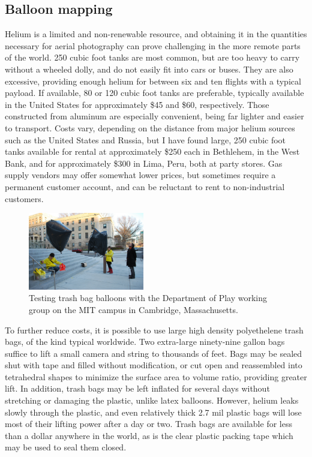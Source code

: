 \documentclass[11pt]{report}
\begin{document}
\subsection{Balloon mapping}

Helium is a limited and non-renewable resource, and obtaining it in the quantities necessary for aerial photography can prove challenging in the more remote parts of the world. 250 cubic foot tanks are most common, but are too heavy to carry without a wheeled dolly, and do not easily fit into cars or buses. They are also excessive, providing enough helium for between six and ten flights with a typical payload. If available, 80 or 120 cubic foot tanks are preferable, typically available in the United States for approximately \$45 and \$60, respectively. Those constructed from aluminum are especially convenient, being far lighter and easier to transport. Costs vary, depending on the distance from major helium sources such as the United States and Russia, but I have found large, 250 cubic foot tanks available for rental at approximately \$250 each in Bethlehem, in the West Bank, and for approximately \$300 in Lima, Peru, both at party stores. Gas supply vendors may offer somewhat lower prices, but sometimes require a permanent customer account, and can be reluctant to rent to non-industrial customers. 

\begin{figure}
	\begin{flushright}
		\includegraphics[width=0.45\textwidth]{images/trash-bag-ballooning.jpg}
		\caption{Testing trash bag balloons with the Department of Play working group on the MIT campus in Cambridge, Massachusetts.}
	\end{flushright}
\end{figure}

To further reduce costs, it is possible to use large high density polyethelene trash bags, of the kind typical worldwide. Two extra-large ninety-nine gallon bags suffice to lift a small camera and string to thousands of feet. Bags may be sealed shut with tape and filled without modification, or cut open and reassembled into tetrahedral shapes to minimize the surface area to volume ratio, providing greater lift. In addition, trash bags may be left inflated for several days without stretching or damaging the plastic, unlike latex balloons. However, helium leaks slowly through the plastic, and even relatively thick 2.7 mil plastic bags will lose most of their lifting power after a day or two. Trash bags are available for less than a dollar anywhere in the world, as is the clear plastic packing tape which may be used to seal them closed.  
\end{document}
